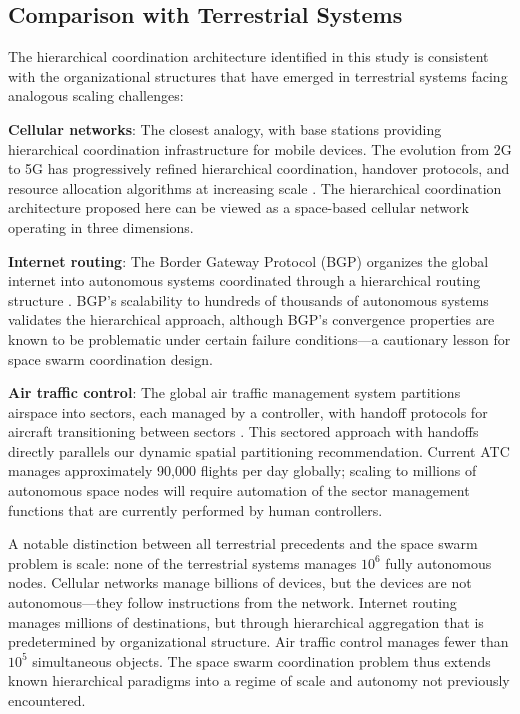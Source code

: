 \documentclass[journal]{IEEEtran}
\begin{document}
\subsection{Comparison with Terrestrial Systems}

The hierarchical coordination architecture identified in this study is consistent with the organizational structures that have emerged in terrestrial systems facing analogous scaling challenges:

\textbf{Cellular networks}: The closest analogy, with base stations providing hierarchical coordination infrastructure for mobile devices. The evolution from 2G to 5G has progressively refined hierarchical coordination, handover protocols, and resource allocation algorithms at increasing scale \cite{rappaport_wireless}. The hierarchical coordination architecture proposed here can be viewed as a space-based cellular network operating in three dimensions.

\textbf{Internet routing}: The Border Gateway Protocol (BGP) organizes the global internet into autonomous systems coordinated through a hierarchical routing structure \cite{rekhter_bgp}. BGP's scalability to hundreds of thousands of autonomous systems validates the hierarchical approach, although BGP's convergence properties are known to be problematic under certain failure conditions---a cautionary lesson for space swarm coordination design.

\textbf{Air traffic control}: The global air traffic management system partitions airspace into sectors, each managed by a controller, with handoff protocols for aircraft transitioning between sectors \cite{icao_atm}. This sectored approach with handoffs directly parallels our dynamic spatial partitioning recommendation. Current ATC manages approximately 90{,}000 flights per day globally; scaling to millions of autonomous space nodes will require automation of the sector management functions that are currently performed by human controllers.

A notable distinction between all terrestrial precedents and the space swarm problem is scale: none of the terrestrial systems manages $10^6$ fully autonomous nodes. Cellular networks manage billions of devices, but the devices are not autonomous---they follow instructions from the network. Internet routing manages millions of destinations, but through hierarchical aggregation that is predetermined by organizational structure. Air traffic control manages fewer than $10^5$ simultaneous objects. The space swarm coordination problem thus extends known hierarchical paradigms into a regime of scale and autonomy not previously encountered.
\end{document}
